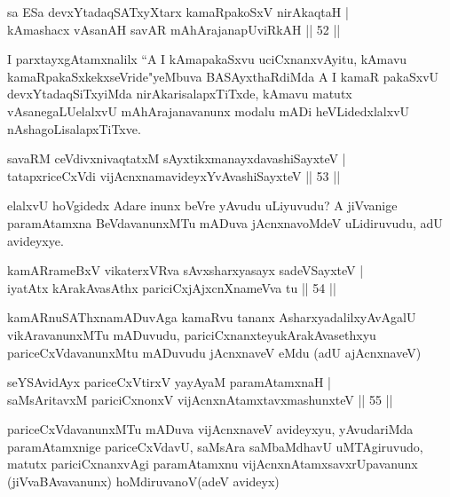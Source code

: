 \begin{shl}
sa ESa devxYtadaqSATxyX\s tarx kamaRpakoSxV nirAkaqtaH |\\
kAmashacx vAsanAH savAR mAhArajanapUviRkAH \hfill || 52 ||
\end{shl}

\begin{artha}
I parxtayxgAtamxnalilx ``A I kAmapakaSxvu uciCxnanxvAyitu, kAmavu kamaRpakaSxkekxseVride"yeMbuva BASAyxthaRdiMda A I kamaR pakaSxvU devxYtadaqSiTxyiMda nirAkarisalapxTiTxde, kAmavu matutx vAsanegaLU\break elalxvU mAhArajanavanunx modalu mADi heVLidedxlalxvU nAshagoLisalapxTiTxve.
\end{artha}

\begin{shl}
savaRM ceVdivxnivaqtatxM sAyxtikxmanayxdavashiSayxteV |\\
tatapxriceCxVdi vijAcnxnamavideyxYvAvashiSayxteV \hfill || 53 ||
\end{shl}

\begin{artha}
elalxvU hoVgidedx Adare inunx beVre yAvudu uLiyuvudu? A jiVvanige paramAtamxna BeVdavanunxMTu  mADuva jAcnxnavoMdeV uLidiruvudu, adU avideyxye.
\end{artha}

\begin{shl}
kamAR\s \s rameBxV vikaterxVRva sAvxsharxyasayx sadeVSayxteV |\\
iyatAtx kArakAvasAthx pariciCxjAjxcnXnameVva tu \hfill || 54 ||
\end{shl}

\begin{artha}
kamARnuSAThxnamADuvAga kamaRvu tananx Asharxyadalilx\break yAvAgalU vikAravanunxMTu mADuvudu, pariciCxnanxteyu\break kArakAvasethxyu pariceCxVdavanunxMtu mADuvudu jAcnxnaveV eMdu (adU ajAcnxnaveV)
\end{artha}


\begin{shl}
seYSA\s vidAyx pariceCxVtirxV yayA\s yaM paramAtamxnaH |\\
saMsAritavxM pariciCxnonxV vijAcnxnAtamxtavxmashunxteV \hfill || 55 ||
\end{shl}

\begin{artha}
pariceCxVdavanunxMTu mADuva vijAcnxnaveV avideyxyu, yAvuda\-riMda paramAtamxnige 
pariceCxVdavU, saMsAra saMbaMdhavU uMTAgiruvudo, matutx pariciCxnanxvAgi paramAtamxnu 
vijAcnxnAtamxsavxrUpavanunx (jiVvaBAvavanunx) hoMdiruvanoV(adeV avideyx)
\end{artha}

